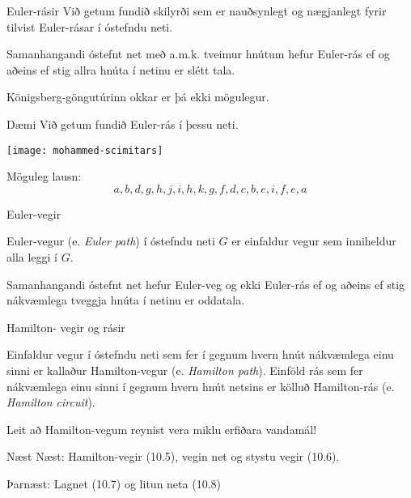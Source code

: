 \documentclass{beamer}
\begin{document}
\begin{frame}{Euler-rásir}
Við getum fundið skilyrði sem er nauðsynlegt og nægjanlegt fyrir tilvist Euler-rásar í óstefndu neti.

\begin{tcolorbox}
Samanhangandi óstefnt net með a.m.k. tveimur hnútum hefur Euler-rás ef og aðeins ef stig allra hnúta í netinu er slétt tala.
\end{tcolorbox}

Königsberg-göngutúrinn okkar er þá ekki mögulegur.
\end{frame}

\begin{frame}{Dæmi}
Við getum fundið Euler-rás í þessu neti.
\begin{center}
\texttt{[image: mohammed-scimitars]}
\end{center}
\pause
Möguleg lausn:
\[
a, b, d, g, h, j, i, h, k, g, f, d, c, b, e, i, f, e, a
\]

\end{frame}

\begin{frame}{Euler-vegir}
\begin{tcolorbox}[title=Euler-vegur]
Euler-vegur (e. \emph{Euler path}) í óstefndu neti $G$ er einfaldur vegur sem inniheldur alla leggi í $G$.
\end{tcolorbox}

\begin{tcolorbox}
Samanhangandi óstefnt net hefur Euler-veg og ekki Euler-rás ef og aðeins ef stig nákvæmlega tveggja hnúta í netinu er oddatala.
\end{tcolorbox}
\end{frame}

\begin{frame}{Hamilton- vegir og rásir}
    \begin{tcolorbox}[title=Hamilton-vegir og rásir]
    Einfaldur vegur í óstefndu neti sem fer í gegnum hvern hnút nákvæmlega einu sinni er kallaður Hamilton-vegur (e. \emph{Hamilton path}). Einföld rás sem fer nákvæmlega einu sinni í gegnum hvern hnút netsins er kölluð Hamilton-rás (e. \emph{Hamilton circuit}).
    \end{tcolorbox}
    Leit að Hamilton-vegum reynist vera miklu erfiðara vandamál!
\end{frame}

\begin{frame}{Næst}
Næst: Hamilton-vegir (10.5), vegin net og stystu vegir (10.6).

Þarnæst: Lagnet (10.7) og litun neta (10.8)
\end{frame}
\end{document}
